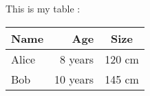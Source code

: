 \documentclass[a4paper]{article}
\begin{document}
This is my table :


\begin{tabular}{|l|r|c|}
   Name & Age & Size \\
   \hline
   Alice & 8 years & 120 cm \\
   Bob & 10 years & 145 cm \\
\end{tabular}
\end{document}
